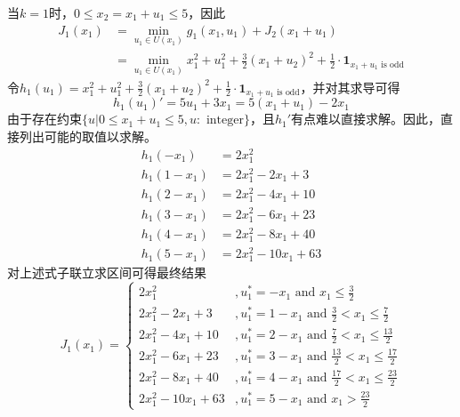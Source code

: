 \documentclass{article}
\begin{document}
\begin{enumerate}[(a)]
            当$k=1$时，$0\leq x_2=x_1+u_1\leq 5$，因此
            \begin{equation}
                \begin{split}
                    J_1(x_1) &=\min_{u_1\in U(x_1)}g_1(x_1,u_1)+J_2(x_1+u_1)\\
                    &=\min_{u_1\in U(x_1)}x_1^2+u_1^2+\frac{3}{2}(x_1+u_2)^2+\frac{1}{2}\cdot\bm{1}_{x_1+u_1\text{ is odd}}
                \end{split}
            \end{equation}
            令$h_1(u_1)=x_1^2+u_1^2+\frac{3}{2}(x_1+u_2)^2+\frac{1}{2}\cdot\bm{1}_{x_1+u_1\text{ is odd}}$，并对其求导可得
            \begin{equation}
                h_1(u_1)'=5u_1+3x_1=5(x_1+u_1)-2x_1
            \end{equation}
            由于存在约束$\{u|0\leq x_1+u_1\leq 5, u:\text{ integer}\}$，且$h_1'$有点难以直接求解。因此，直接列出可能的取值以求解。
            \begin{equation}
                \begin{aligned}
                    h_1(-x_1) &= 2x^2_1\\
                    h_1(1-x_1) &= 2x^2_1-2x_1+3\\
                    h_1(2-x_1) &= 2x^2_1-4x_1+10\\
                    h_1(3-x_1) &= 2x^2_1-6x_1+23\\
                    h_1(4-x_1) &= 2x^2_1-8x_1+40\\
                    h_1(5-x_1) &= 2x^2_1-10x_1+63
                \end{aligned}
            \end{equation}
            对上述式子联立求区间可得最终结果
            \begin{equation}
                J_1(x_1)=
                \begin{cases}
                    2x^2_1 &, u_1^*=-x_1\text{ and } x_1\leq\frac{3}{2}\\
                    2x^2_1-2x_1+3 &, u_1^*=1-x_1\text{ and } \frac{3}{2}<x_1\leq\frac{7}{2}\\
                    2x^2_1-4x_1+10 &, u_1^*=2-x_1\text{ and } \frac{7}{2}<x_1\leq\frac{13}{2}\\
                    2x^2_1-6x_1+23 &, u_1^*=3-x_1\text{ and } \frac{13}{2}<x_1\leq\frac{17}{2}\\
                    2x^2_1-8x_1+40 &, u_1^*=4-x_1\text{ and } \frac{17}{2}<x_1\leq\frac{23}{2} \\
                    2x^2_1-10x_1+63 &, u_1^*=5-x_1\text{ and } x_1>\frac{23}{2}
                \end{cases}
            \end{equation}


\end{enumerate}
\end{document}
